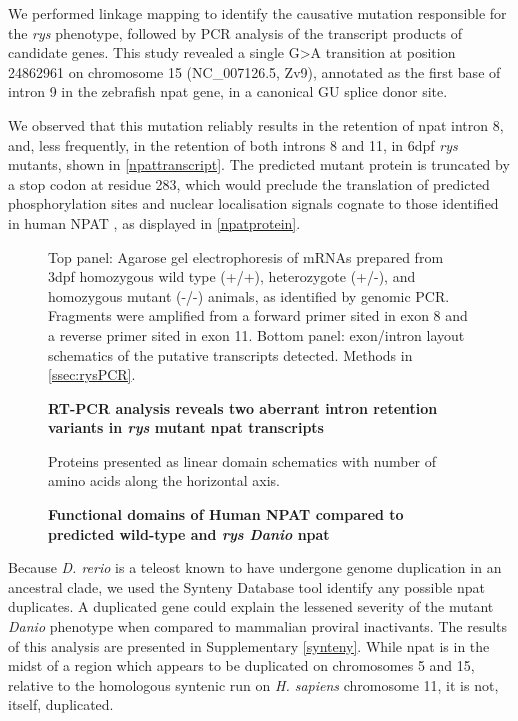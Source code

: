 We performed linkage mapping to identify the causative mutation responsible for the \textit{rys} phenotype, followed by PCR analysis of the transcript products of candidate genes. This study revealed a single G\textgreater{}A transition at position 24862961 on chromosome 15 (NC\_007126.5, Zv9), annotated as the first base of intron 9 in the zebrafish npat gene, in a canonical GU splice donor site. 

We observed that this mutation reliably results in the retention of npat intron 8, and, less frequently, in the retention of both introns 8 and 11, in 6dpf \textit{rys} mutants, shown in \autoref{npattranscript}. The predicted mutant protein is truncated by a stop codon at residue 283, which would preclude the translation of predicted phosphorylation sites and nuclear localisation signals cognate to those identified in human NPAT \cite{Ma2000,Sagara2002}, as displayed in \autoref{npatprotein}.

\begin{figure}[!h]
    \caption{{\bf RT-PCR analysis reveals two aberrant intron retention variants in \textit{rys} mutant npat transcripts}}
    \label{npattranscript}
    Top panel: Agarose gel electrophoresis of mRNAs prepared from 3dpf homozygous wild type (+/+), heterozygote (+/-), and homozygous mutant (-/-) animals, as identified by genomic PCR. Fragments were amplified from a forward primer sited in exon 8 and a reverse primer sited in exon 11.
    Bottom panel: exon/intron layout schematics of the putative transcripts detected.
    Methods in \autoref{ssec:rysPCR}.
\end{figure}

\begin{figure}[!h]
    \caption{{\bf Functional domains of Human NPAT compared to predicted wild-type and \textit{rys Danio} npat}}
    Proteins presented as linear domain schematics with number of amino acids along the horizontal axis.
    \label{npatprotein}
\end{figure}
\FloatBarrier

Because \textit{D. rerio} is a teleost known to have undergone genome duplication in an ancestral clade, we used the Synteny Database tool \cite{Catchen2009} identify any possible npat duplicates. A duplicated gene could explain the lessened severity of the mutant \textit{Danio} phenotype when compared to mammalian proviral inactivants. The results of this analysis are presented in Supplementary \autoref{synteny}. While npat is in the midst of a region which appears to be duplicated on chromosomes 5 and 15, relative to the homologous syntenic run on \textit{H. sapiens} chromosome 11, it is not, itself, duplicated.

